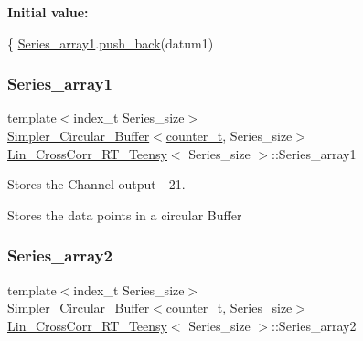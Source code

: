 {\bfseries Initial value\+:}
\begin{DoxyCode}
\{
    \hyperlink{classLin__CrossCorr__RT__Teensy_a13307ad04080703e9ef8c0cd9794a6b0}{Series\_array1}.\hyperlink{classSimpler__Circular__Buffer_af4bdd0a6d3fc7a8c06f62b0d996158f0}{push\_back}(datum1)
\end{DoxyCode}
\mbox{\label{classLin__CrossCorr__RT__Teensy_a13307ad04080703e9ef8c0cd9794a6b0}} 
\subsubsection{\texorpdfstring{Series\+\_\+array1}{Series\_array1}}
{\footnotesize\ttfamily template$<$index\+\_\+t Series\+\_\+size$>$ \\
\hyperlink{classSimpler__Circular__Buffer}{Simpler\+\_\+\+Circular\+\_\+\+Buffer}$<$\hyperlink{types_8hpp_ac89ac912f524b3e3fa3720ea55fec966}{counter\+\_\+t}, Series\+\_\+size$>$ \hyperlink{classLin__CrossCorr__RT__Teensy}{Lin\+\_\+\+Cross\+Corr\+\_\+\+R\+T\+\_\+\+Teensy}$<$ Series\+\_\+size $>$\+::Series\+\_\+array1}



Stores the Channel output -\/ 21. 

Stores the data points in a circular Buffer \mbox{\label{classLin__CrossCorr__RT__Teensy_a509bcfdab5a3239a014f5805c388172a}} 
\subsubsection{\texorpdfstring{Series\+\_\+array2}{Series\_array2}}
{\footnotesize\ttfamily template$<$index\+\_\+t Series\+\_\+size$>$ \\
\hyperlink{classSimpler__Circular__Buffer}{Simpler\+\_\+\+Circular\+\_\+\+Buffer}$<$\hyperlink{types_8hpp_ac89ac912f524b3e3fa3720ea55fec966}{counter\+\_\+t}, Series\+\_\+size$>$ \hyperlink{classLin__CrossCorr__RT__Teensy}{Lin\+\_\+\+Cross\+Corr\+\_\+\+R\+T\+\_\+\+Teensy}$<$ Series\+\_\+size $>$\+::Series\+\_\+array2}

